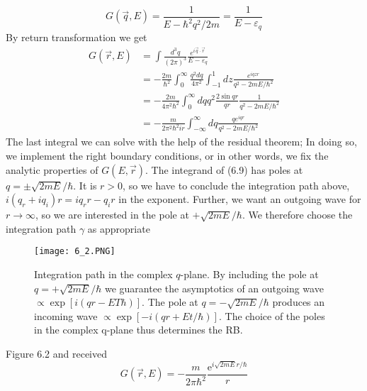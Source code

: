 \begin{equation}
    G(\vec{q}, E)=\frac{1}{E-\hbar^{2} q^{2} / 2 m}=\frac{1}{E-\varepsilon_{q}}
    \end{equation}
By return transformation we get
\begin{equation}
\begin{aligned} G(\vec{r}, E) &=\int \frac{d^{3} q}{(2 \pi)^{3}} \frac{e^{i \vec{q} \cdot \vec{r}}}{E-\varepsilon_{q}} \\ &=-\frac{2 m}{\hbar^{2}} \int_{0}^{\infty} \frac{q^{2} d q}{4 \pi^{2}} \int_{-1}^{1} d z \frac{e^{i q z r}}{q^{2}-2 m E / \hbar^{2}} \\ &=-\frac{2 m}{4 \pi^{2} \hbar^{2}} \int_{0}^{\infty} d q q^{2} \frac{2 \sin q r}{q r} \frac{1}{q^{2}-2 m E / \hbar^{2}} \\ &=-\frac{m}{2 \pi^{2} \hbar^{2} i r} \int_{-\infty}^{\infty} d q \frac{q e^{i q r}}{q^{2}-2 m E / \hbar^{2}} \end{aligned}
\end{equation}
The last integral we can solve with the help of the residual theorem; In doing so, we implement the right boundary conditions, or in other words, we fix the analytic properties of $G (E, \vec{r})$. The integrand of (6.9) has poles at $q = \pm \sqrt{2mE }/ \hbar$. It is $r> 0$, so we have to conclude the integration path above, $i (q_r + iq_i) r = iq_rr - q_ir$ in the exponent. Further, we want an outgoing wave for $r\rightarrow\infty$, so we are interested in the pole at $+\sqrt{2mE} / \hbar$. We therefore choose the integration path $\gamma$ as appropriate
\begin{figure}[ht]
    \begin{minipage}{0.5\textwidth}
        \centering
        \texttt{[image: 6\_2.PNG]}
    \end{minipage}
    \begin{minipage}{0.5\textwidth}
        \caption{Integration path in the complex $q$-plane. By including the pole at $q = + \sqrt{2mE} / \hbar$ we guarantee the asymptotics of an outgoing wave $\propto \operatorname{exp}[i(qr-ET\hbar)]$. The pole at $q = -\sqrt{2mE} / \hbar$ produces an incoming wave $\propto \operatorname{exp}[-i(qr+Et/\hbar)]$. The choice of the poles in the complex q-plane thus determines the RB.}
    \end{minipage}
\end{figure}
Figure 6.2 and received
\begin{equation}
    G(\vec{r}, E)=-\frac{m}{2 \pi \hbar^{2}} \frac{\mathrm{e}^{i \sqrt{2 m E} r / \hbar}}{r}
    \end{equation}
